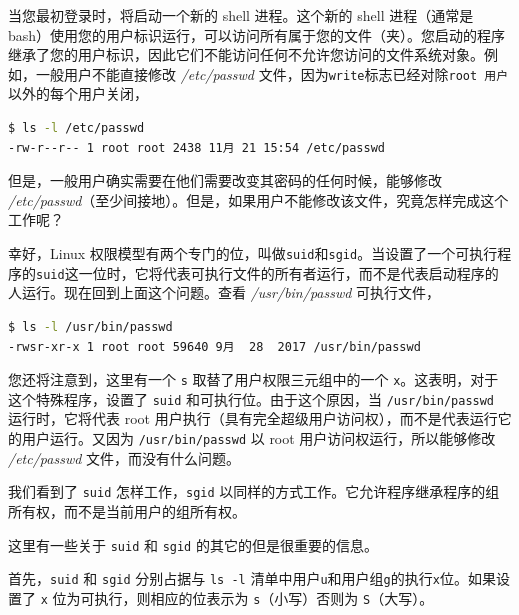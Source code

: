 \documentclass[doctor,openright,twoside]{sjtuthesis}
\newcommand{\passthrough}[1]{#1}
\theoremstyle{plain}
\theoremstyle{definition}
\theoremstyle{remark}
\theoremstyle{ocrenumbox}
\theoremstyle{plain}
\begin{document}
当您最初登录时，将启动一个新的 shell 进程。这个新的 shell 进程（通常是
bash）使用您的用户标识运行，可以访问所有属于您的文件（夹）。您启动的程序继承了您的用户标识，因此它们不能访问任何不允许您访问的文件系统对象。例如，一般用户不能直接修改
\emph{/etc/passwd}
文件，因为\passthrough{\lstinline!write!}标志已经对除\passthrough{\lstinline!root 用户!}以外的每个用户关闭，

\begin{lstlisting}[language=bash]
$ ls -l /etc/passwd
-rw-r--r-- 1 root root 2438 11月 21 15:54 /etc/passwd
\end{lstlisting}

但是，一般用户确实需要在他们需要改变其密码的任何时候，能够修改
\emph{/etc/passwd}（至少间接地）。但是，如果用户不能修改该文件，究竟怎样完成这个工作呢？

幸好，Linux
权限模型有两个专门的位，叫做\passthrough{\lstinline!suid!}和\passthrough{\lstinline!sgid!}。当设置了一个可执行程序的\passthrough{\lstinline!suid!}这一位时，它将代表可执行文件的所有者运行，而不是代表启动程序的人运行。现在回到上面这个问题。查看
\emph{/usr/bin/passwd} 可执行文件，

\begin{lstlisting}[language=bash]
$ ls -l /usr/bin/passwd
-rwsr-xr-x 1 root root 59640 9月  28  2017 /usr/bin/passwd
\end{lstlisting}

您还将注意到，这里有一个 \passthrough{\lstinline!s!}
取替了用户权限三元组中的一个
\passthrough{\lstinline!x!}。这表明，对于这个特殊程序，设置了
\passthrough{\lstinline!suid!} 和可执行位。由于这个原因，当
\passthrough{\lstinline!/usr/bin/passwd!} 运行时，它将代表 root
用户执行（具有完全超级用户访问权），而不是代表运行它的用户运行。又因为
\passthrough{\lstinline!/usr/bin/passwd!} 以 root
用户访问权运行，所以能够修改 \emph{/etc/passwd} 文件，而没有什么问题。

我们看到了 \passthrough{\lstinline!suid!}
怎样工作，\passthrough{\lstinline!sgid!}
以同样的方式工作。它允许程序继承程序的组所有权，而不是当前用户的组所有权。

这里有一些关于 \passthrough{\lstinline!suid!} 和
\passthrough{\lstinline!sgid!} 的其它的但是很重要的信息。

首先，\passthrough{\lstinline!suid!} 和 \passthrough{\lstinline!sgid!}
分别占据与 \passthrough{\lstinline!ls -l!}
清单中用户\passthrough{\lstinline!u!}和用户组\passthrough{\lstinline!g!}的执行\passthrough{\lstinline!x!}位。如果设置了
\passthrough{\lstinline!x!} 位为可执行，则相应的位表示为
\passthrough{\lstinline!s!}（小写）否则为
\passthrough{\lstinline!S!}（大写）。
\end{document}
